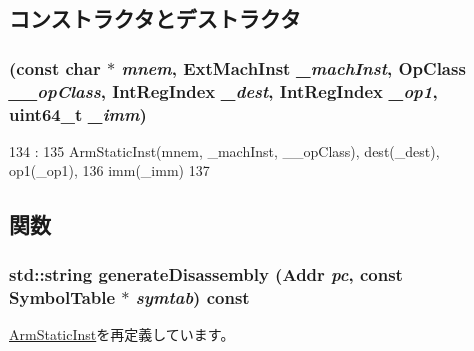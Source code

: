 \subsection{コンストラクタとデストラクタ}
\hypertarget{classArmISA_1_1DataX1RegImmOp_a060333d6accb9a30048d5a4fae502f3b}{
\subsubsection[{DataX1RegImmOp}]{ (const char $\ast$ {\em mnem}, \/  {\bf ExtMachInst} {\em \_\-machInst}, \/  OpClass {\em \_\-\_\-opClass}, \/  {\bf IntRegIndex} {\em \_\-dest}, \/  {\bf IntRegIndex} {\em \_\-op1}, \/  uint64\_\-t {\em \_\-imm})}}
\label{classArmISA_1_1DataX1RegImmOp_a060333d6accb9a30048d5a4fae502f3b}



\begin{DoxyCode}
134                                                                        :
135         ArmStaticInst(mnem, _machInst, __opClass), dest(_dest), op1(_op1),
136         imm(_imm)
137     {}

\end{DoxyCode}


\subsection{関数}
\hypertarget{classArmISA_1_1DataX1RegImmOp_a95d323a22a5f07e14d6b4c9385a91896}{
\subsubsection[{generateDisassembly}]{\setlength{\rightskip}{0pt plus 5cm}std::string generateDisassembly ({\bf Addr} {\em pc}, \/  const SymbolTable $\ast$ {\em symtab}) const}}
\label{classArmISA_1_1DataX1RegImmOp_a95d323a22a5f07e14d6b4c9385a91896}


\hyperlink{classArmISA_1_1ArmStaticInst_a95d323a22a5f07e14d6b4c9385a91896}{ArmStaticInst}を再定義しています。


